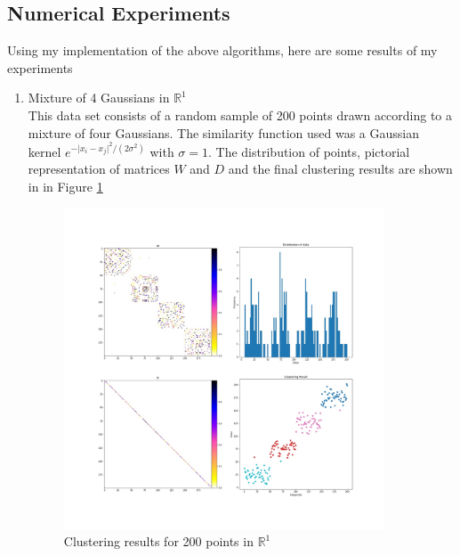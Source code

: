 \documentclass[10pt,a4paper, nocenter]{report}
\newcommand{\abs}[1]{\lvert {#1} \rvert}
\begin{document}
    \subsection{Numerical Experiments}

    Using my implementation of the above algorithms, here are some results of my experiments

    \begin{enumerate}
        \item{Mixture of 4 Gaussians in $\mathbb{R}^1$}\\
        This data set consists of a random sample of 200 points drawn according to a mixture of four Gaussians. The similarity function used was a Gaussian kernel $e^{-\abs{x_i - x_j}^2/(2\sigma^2)}$ with $\sigma = 1$. The distribution of points, pictorial representation of matrices $W$ and $D$ and the final clustering results are shown in in Figure \ref{fig:1dresults}

        \begin{figure}[h]
        \includegraphics[width=0.9\textwidth]{../../images/1DCluster.jpg}
        \caption{Clustering results for 200 points in $\mathbb{R}^1$}
        \label{fig:1dresults}
        \end{figure}


\end{enumerate}
\end{document}
